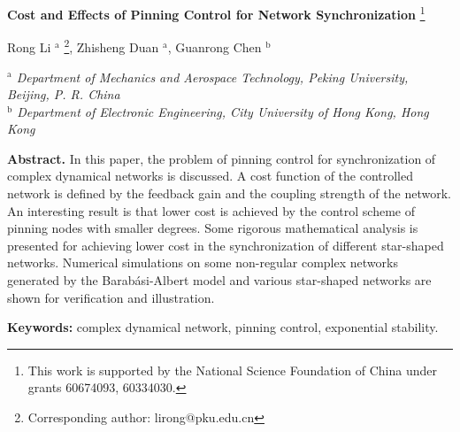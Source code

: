 \documentclass[11pt]{article}
\begin{document}
\begin{center}
{{\Large \bf Cost and Effects of Pinning Control for Network
Synchronization}}
 \footnote{
{\footnotesize This work is supported by the National
 Science Foundation of
 China under grants 60674093, 60334030.}}
\end{center}
\vskip 0.2cm
\begin{center}
 Rong Li $^{\textrm{a}}$ \footnote{ {\footnotesize Corresponding
author: lirong@pku.edu.cn}},
  \quad Zhisheng Duan $^{\textrm{a}}$,
  \quad Guanrong Chen $^{\textrm{b}}$
 \end{center}
\begin{center}
{\small \it  $^{\textrm{a}}$ Department of Mechanics and Aerospace
Technology, Peking University, Beijing, P. R. China
\\ $^{\textrm{b}}$ Department of Electronic Engineering, City University of Hong Kong, Hong Kong}
\end{center}

\vspace*{1\baselineskip}
\begin{center}
{\begin{minipage}{127mm} {\small {\bf Abstract.} In this paper, the
problem of pinning control for synchronization of complex dynamical
networks is discussed. A cost function of the controlled network is
defined by the feedback gain and the coupling strength of the
network. An interesting result is that lower cost is achieved by the
control scheme of pinning nodes with smaller degrees. Some rigorous
mathematical analysis is presented for achieving lower cost in the
synchronization of different star-shaped networks. Numerical
simulations on some non-regular complex networks generated by the
Barab\'{a}si-Albert model and various star-shaped networks are shown
for verification and illustration.}

\vspace*{0.5\baselineskip} {{\bf Keywords:}
 complex dynamical network, pinning control, exponential stability.}

\end{minipage}
}
\end{center}

\abovedisplayskip=0.13cm \abovedisplayshortskip=0.06cm
\belowdisplayskip=0.13cm \belowdisplayshortskip=0.08cm

\def\dis{\displaystyle}
\end{document}
